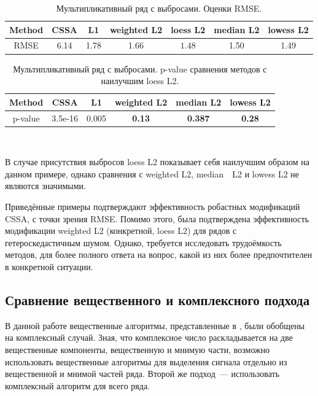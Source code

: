 \documentclass[specialist,
               substylefile = spbu.rtx,
               subf,href,colorlinks=true, 12pt]{disser}
\begin{document}
\begin{table}[H]
	\begin{center}
		\caption{Мультипликативный ряд с выбросами. Оценки RMSE.}
		\label{tab4}
		\begin{tabular}{|c|c|c|c|c|c|c|}
			\hline
			Method 	& CSSA & L1 & weighted L2 & loess L2 & median L2 & lowess L2 \\
			\hline
			RMSE & 6.14  & 1.78  & 1.66 & $\mathbf{1.48}$ & 1.50 & 1.49\\
			\hline
		\end{tabular}
	\end{center}
\end{table}

\begin{table}[H]
	\caption{Мультипликативный ряд с выбросами. p-value сравнения методов с наилучшим loess L2.}
	\label{tab: pval4}
	\begin{center}
		\begin{tabular}{|c|c|c|c|c|c|}
			\hline
			Method & CSSA	& L1 & weighted L2 & median L2 & lowess L2  \\
			\hline
			p-value & 3.5e-16   & 0.005 &   \textbf{0.13}  &  \textbf{0.387} & \textbf{0.28}  \\
			\hline
		\end{tabular} \\
	\end{center}
\end{table}

В случае присутствия выбросов loess L2 показывает себя наилучшим образом на данном примере, однако сравнения с weighted L2, median~\ L2 и lowess L2 не являются значимыми.

Приведённые примеры подтверждают эффективность робастных модификаций CSSA, с точки зрения RMSE. Помимо этого, была подтверждена эффективность модификации weighted L2 (конкретной, loess L2) для рядов с гетероскедастичным шумом. Однако, требуется исследовать трудоёмкость методов, для более полного ответа на вопрос, какой из них более предпочтителен в конкретной ситуации.

\subsection{Сравнение вещественного и комплексного подхода} \label{sec:comp}

В данной работе вещественные алгоритмы, представленные в \cite{Tretyakova20}, были обобщены на комплексный случай. Зная, что комплексное число раскладывается на две вещественные компоненты, вещественную и мнимую части, возможно использовать вещественные алгоритмы для выделения сигнала отдельно из вещественной и мнимой частей ряда. Второй же подход~--- использовать комплексный алгоритм для всего ряда.
\end{document}
